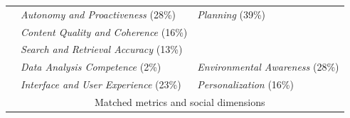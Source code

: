 \begin{table}[!t]
\begin{tabular}{@{}lp{}p{}@{}}
		                                                                                                  & \cellcolor{plan}\textit{Autonomy and Proactiveness} (28\%)                                                                                                                                                                                    & \multirow{-2}{*}{\cellcolor{plan}\textit{Planning} (39\%)}                \\
		                                                                                                  & \cellcolor{env}\textit{Content Quality and Coherence} (16\%)                                                                                                                                                                                  & \cellcolor{env}                                                           \\
		                                                                                                  & \cellcolor{env}\textit{Search and Retrieval Accuracy} (13\%)                                                                                                                                                                                  & \cellcolor{env}                                                           \\
		                                                                                                  & \cellcolor{env}\textit{Data Analysis Competence} (2\%)                                                                                                                                                                                        & \multirow{-3}{*}{ \cellcolor{env}\textit{Environmental Awareness} (28\%)} \\
		                                                                                                  & \cellcolor{pers}\textit{Interface and User Experience} (23\%)                                                                                                                                                                                 & \cellcolor{pers}\textit{Personalization} (16\%)                           \\
		\midrule \multirow{13}{*}{\rotatebox[origin=c]{90}{\textbf{Sotopia} \citep{zhousotopia}}}         & \multicolumn{2}{c}{Matched metrics and social dimensions}                                                                                                                                                                                      \\

\end{tabular}
\end{table}
